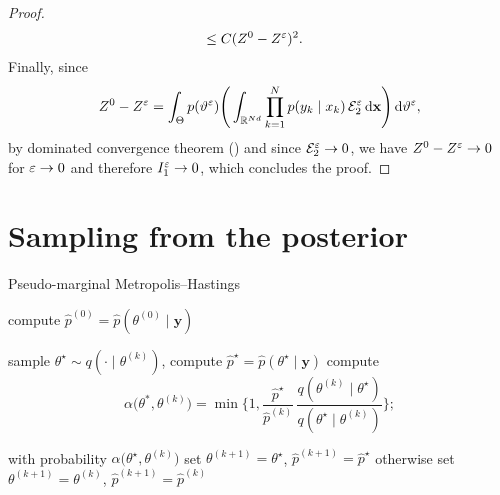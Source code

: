 \documentclass[10pt]{article}
\begin{document}
\begin{proof}
\begin{equation}
\begin{aligned}
		&\leq C(Z^0 - Z^\varepsilon)^2.
	\end{aligned}
	\end{equation}
	Finally, since
	\begin{equation}
		Z^0 - Z^\varepsilon = \int_{\Theta} p(\vartheta^\varepsilon) \Bigg(\int_{\mathbb{R}^{Nd}} \prod_{k=1}^N p(y_k \mid x_k) \, \mathcal E_2^\varepsilon \,\mathrm{d} \mathbf x \Bigg) \,\mathrm{d} \vartheta^\varepsilon,
	\end{equation}
	by dominated convergence theorem () and since $\mathcal E_2^\varepsilon \to 0$, we have $Z^0 - Z^\varepsilon \to 0$ for $\varepsilon \to 0$ and therefore $I_1^\varepsilon \to 0$, which concludes the proof.
\end{proof}

\section{Sampling from the posterior}

\begin{algorithm}[t]
	\caption{Pseudo-marginal Metropolis--Hastings}
	\label{alg:PMMH}
	compute $\hat p^{(0)} = \hat p(\theta^{(0)} \mid \mathbf y)$ \;
	 {
		sample $\theta^\star \sim q(\cdot \mid \theta^{(k)})$, compute $\hat p^\star = \hat p(\theta^\star \mid \mathbf y)$ \;
		compute $$\alpha\big(\theta^*, \theta^{(k)}\big) = \min\Big\{1, \frac{\hat p^\star}{\hat p^{(k)}} \, \frac{q(\theta^{(k)} \mid \theta^\star)}{q(\theta^\star \mid \theta^{(k)})}\Big\};$$ 
		
		with probability $\alpha\big(\theta^\star, \theta^{(k)}\big)$ set $\theta^{(k+1)} = \theta^\star$, $\hat p^{(k+1)} = \hat p^\star$ \;
		otherwise set $\theta^{(k+1)} = \theta^{(k)}$, $\hat p^{(k+1)} = \hat p^{(k)}$ \;
	}
\end{algorithm}
\end{document}

